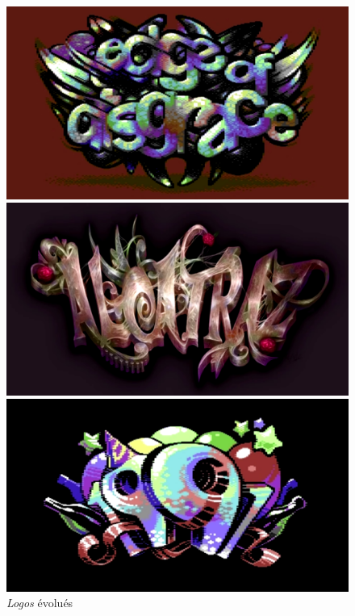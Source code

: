\begin{figure}[h]
  \begin{minipage}[b]{0.30\linewidth}
    \centering
    \includegraphics[width=\linewidth]{images/demoscene/demos/logo1.png}
  \end{minipage}
  \hfill
  \begin{minipage}[b]{0.30\linewidth}
    \centering
    \includegraphics[width=\linewidth]{images/demoscene/demos/logo2.png}
  \end{minipage}
  \hfill
  \begin{minipage}[b]{0.30\linewidth}
    \centering
    \includegraphics[width=\linewidth]{images/demoscene/demos/logo3.png}
  \end{minipage}
  \caption{\textit{Logos} évolués}
  \label{logo}
\end{figure}


